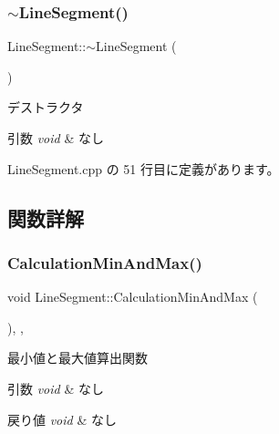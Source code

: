 \subsubsection{\texorpdfstring{$\sim$\+Line\+Segment()}{~LineSegment()}}
{\footnotesize\ttfamily Line\+Segment\+::$\sim$\+Line\+Segment (\begin{DoxyParamCaption}{ }\end{DoxyParamCaption})}



デストラクタ 


\begin{DoxyParams}{引数}
{\em void} & なし \\
\hline
\end{DoxyParams}


 Line\+Segment.\+cpp の 51 行目に定義があります。



\subsection{関数詳解}
\mbox{\label{class_line_segment_aa680211e185d2c98febb5af5a6527496}} 
\subsubsection{\texorpdfstring{Calculation\+Min\+And\+Max()}{CalculationMinAndMax()}}
{\footnotesize\ttfamily void Line\+Segment\+::\+Calculation\+Min\+And\+Max (\begin{DoxyParamCaption}{ }\end{DoxyParamCaption})\hspace{0.3cm}{\ttfamily [override]}, {\ttfamily [private]}, {\ttfamily [virtual]}}



最小値と最大値算出関数 


\begin{DoxyParams}{引数}
{\em void} & なし \\
\hline
\end{DoxyParams}

\begin{DoxyRetVals}{戻り値}
{\em void} & なし \\
\hline
\end{DoxyRetVals}


